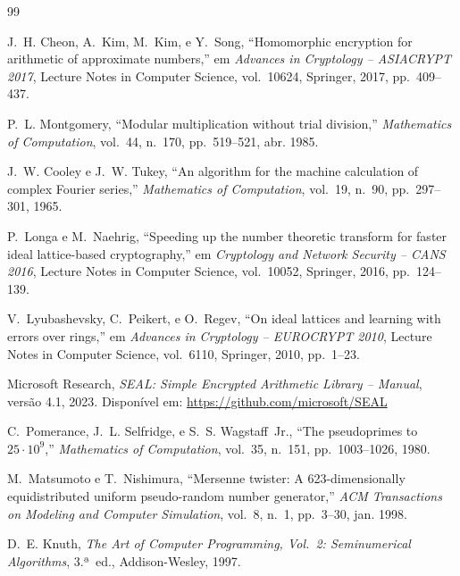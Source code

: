 \documentclass[11pt,a4paper]{report}
\begin{document}
\begin{thebibliography}{99}

J.~H. Cheon, A.~Kim, M.~Kim, e Y.~Song,
``Homomorphic encryption for arithmetic of approximate numbers,''
em \emph{Advances in Cryptology -- ASIACRYPT 2017},
Lecture Notes in Computer Science, vol.~10624,
Springer, 2017, pp.~409--437.

P.~L. Montgomery,
``Modular multiplication without trial division,''
\emph{Mathematics of Computation},
vol.~44, n.~170, pp.~519--521, abr. 1985.

J.~W. Cooley e J.~W. Tukey,
``An algorithm for the machine calculation of complex Fourier series,''
\emph{Mathematics of Computation},
vol.~19, n.~90, pp.~297--301, 1965.

P.~Longa e M.~Naehrig,
``Speeding up the number theoretic transform for faster ideal lattice-based cryptography,''
em \emph{Cryptology and Network Security -- CANS 2016},
Lecture Notes in Computer Science, vol.~10052,
Springer, 2016, pp.~124--139.

V.~Lyubashevsky, C.~Peikert, e O.~Regev,
``On ideal lattices and learning with errors over rings,''
em \emph{Advances in Cryptology -- EUROCRYPT 2010},
Lecture Notes in Computer Science, vol.~6110,
Springer, 2010, pp.~1--23.

Microsoft Research,
\emph{SEAL: Simple Encrypted Arithmetic Library -- Manual},
versão 4.1, 2023.
Disponível em: \url{https://github.com/microsoft/SEAL}

C.~Pomerance, J.~L. Selfridge, e S.~S. Wagstaff~Jr.,
``The pseudoprimes to $25 \cdot 10^9$,''
\emph{Mathematics of Computation},
vol.~35, n.~151, pp.~1003--1026, 1980.

M.~Matsumoto e T.~Nishimura,
``Mersenne twister: A 623-dimensionally equidistributed uniform pseudo-random number
generator,''
\emph{ACM Transactions on Modeling and Computer Simulation},
vol.~8, n.~1, pp.~3--30, jan. 1998.

D.~E. Knuth,
\emph{The Art of Computer Programming, Vol.~2: Seminumerical Algorithms},
3.ª~ed., Addison-Wesley, 1997.

\end{thebibliography}
\end{document}
